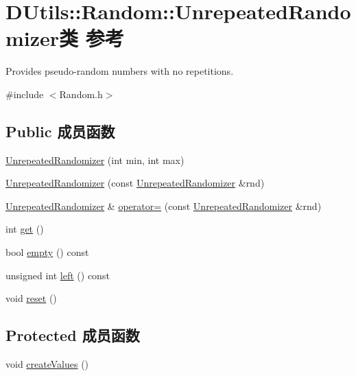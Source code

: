 \hypertarget{classDUtils_1_1Random_1_1UnrepeatedRandomizer}{\section{D\-Utils\-:\-:Random\-:\-:Unrepeated\-Randomizer类 参考}
\label{classDUtils_1_1Random_1_1UnrepeatedRandomizer}
}


Provides pseudo-\/random numbers with no repetitions.  




{\ttfamily \#include $<$Random.\-h$>$}

\subsection*{Public 成员函数}
\begin{DoxyCompactItemize}
\item 
\hyperlink{classDUtils_1_1Random_1_1UnrepeatedRandomizer_ae073cba77da776dae607f22fd289b220}{Unrepeated\-Randomizer} (int min, int max)
\item 
\hyperlink{classDUtils_1_1Random_1_1UnrepeatedRandomizer_af4d4b9621cb9a55ec59fb311798a3a5b}{Unrepeated\-Randomizer} (const \hyperlink{classDUtils_1_1Random_1_1UnrepeatedRandomizer}{Unrepeated\-Randomizer} \&rnd)
\item 
\hyperlink{classDUtils_1_1Random_1_1UnrepeatedRandomizer}{Unrepeated\-Randomizer} \& \hyperlink{classDUtils_1_1Random_1_1UnrepeatedRandomizer_a18f74b44fe6747fa3498bdbe6422648e}{operator=} (const \hyperlink{classDUtils_1_1Random_1_1UnrepeatedRandomizer}{Unrepeated\-Randomizer} \&rnd)
\item 
int \hyperlink{classDUtils_1_1Random_1_1UnrepeatedRandomizer_ae1bf6a140e322962f65b2c98dc07a3ac}{get} ()
\item 
bool \hyperlink{classDUtils_1_1Random_1_1UnrepeatedRandomizer_a70d6ff7e510b11fde4640033963e8627}{empty} () const 
\item 
unsigned int \hyperlink{classDUtils_1_1Random_1_1UnrepeatedRandomizer_a29599dcd4c885298736d46086dad6485}{left} () const 
\item 
void \hyperlink{classDUtils_1_1Random_1_1UnrepeatedRandomizer_a315e00744de8bb3794d154797d02ec1f}{reset} ()
\end{DoxyCompactItemize}
\subsection*{Protected 成员函数}
\begin{DoxyCompactItemize}
\item 
void \hyperlink{classDUtils_1_1Random_1_1UnrepeatedRandomizer_a583497053acec6991b9a872f924e8ccb}{create\-Values} ()
\end{DoxyCompactItemize}
